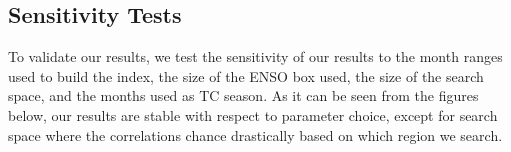 \documentclass[]{article}
\begin{document}

\subsection{Sensitivity Tests}
To validate our results, we test the sensitivity of our results to the month ranges used to build the index, the size of the ENSO box used, the size of the search space, and the months used as TC season. As it can be seen from the figures below, our results are stable with respect to parameter choice, except for search space where the correlations chance drastically based on which region we search.
\end{document}
